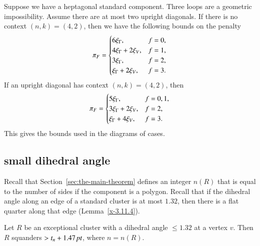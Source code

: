 Suppose we have a heptagonal standard component.  Three loops are a
geometric impossibility. Assume there are at most two upright
diagonals.
 If there is no context $(n,k)=(4,2)$,
 then we have the following bounds on the penalty
    $$
    {\pi_F} = \begin{cases} 6\xi_\Gamma, & f=0,\\
                 4\xi_\Gamma+2\xi_V, & f=1,\\
                3\xi_\Gamma, & f=2,\\
                \xi_\Gamma+2\xi_V, & f=3.
            \end{cases}
    $$
If an upright diagonal has context $(n,k)=(4,2)$, then
    $$
    {\pi_F} = \begin{cases} 5\xi_\Gamma, & f=0,1,\\
                3\xi_\Gamma + 2\xi_V, & f=2,\\
                \xi_\Gamma + 4 \xi_V, &f = 3.\\
            \end{cases}
    $$
This gives the bounds used in the diagrams of cases.





\subsection{small dihedral angle} %
\label{sec:small-dih}

Recall that Section~\ref{sec:the-main-theorem} defines an integer $n(R)$
that is equal to the number of sides if the component is a polygon.  Recall
that if the dihedral angle along an edge of a standard cluster is at
most $1.32$, then there is a flat quarter along that edge
(Lemma~\ref{x-3.11.4}).



\begin{lemma}
Let $R$ be an exceptional cluster with a dihedral angle
$\le1.32$ at a vertex $v$. Then $R$ squanders $>t_n+1.47\,\hbox{\it pt}$, where
$n=n(R)$.
\end{lemma}

